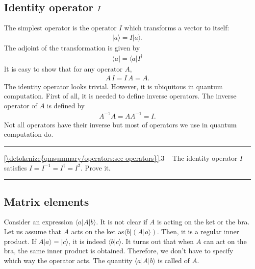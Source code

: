 \documentclass[letterpaper,10pt,english]{jupyterBook}
\begin{document}
\subsection{Identity operator \protect\(I\protect\)}
\label{\detokenize{qmsummary/operators:identity-operator-i}}
\sphinxAtStartPar
The simplest operator is the  operator \(I\) which transforms a vector to itself:
\begin{equation*}
\begin{split}
|a \rangle = I |a \rangle.
\end{split}
\end{equation*}
\sphinxAtStartPar
The adjoint of the transformation is given by
\begin{equation*}
\begin{split}
\langle a | = \langle a | I^\dagger
\end{split}
\end{equation*}
\sphinxAtStartPar
It is easy to show that for any operator \(A\),
\begin{equation*}
\begin{split}
A\,I = I\, A = A.
\end{split}
\end{equation*}
\sphinxAtStartPar
The identity operator looks trivial.  However, it is ubiquitous in quantum computation. First of all, it is needed to define inverse operators.  The inverse operator of \(A\) is defined by
\begin{equation*}
\begin{split}
A^{-1} A = A A^{-1} = I.
\end{split}
\end{equation*}
\sphinxAtStartPar
Not all operators have their inverse but most of operators we use in quantum computation do.


\bigskip\hrule\bigskip


\sphinxAtStartPar
{} \hyperref[\detokenize{qmsummary/operators:sec-operators}]{\ref{\detokenize{qmsummary/operators:sec-operators}}}.3     The identity operator \(I\) satisfies \(I = I^{-1} = I^\dagger = I^2\).  Prove it.


\bigskip\hrule\bigskip



\subsection{Matrix elements}
\label{\detokenize{qmsummary/operators:matrix-elements}}
\sphinxAtStartPar
Consider an expression \(\langle a | A | b \rangle\).  It is not clear if \(A\) is acting on the ket or the bra. Let us assume that \(A\) acts on the ket as\(\langle b | (A | a \rangle)\).  Then, it is a regular inner product.  If \(A | a \rangle=| c \rangle\), it is indeed \(\langle  b|c \rangle\).  It turns out that when \(A\) can act on the bra, the same inner product is obtained.  Therefore, we don’t have to specify which way the operator acts.  The quantity \(\langle a | A | b \rangle\) is called  of \(A\).
\end{document}
